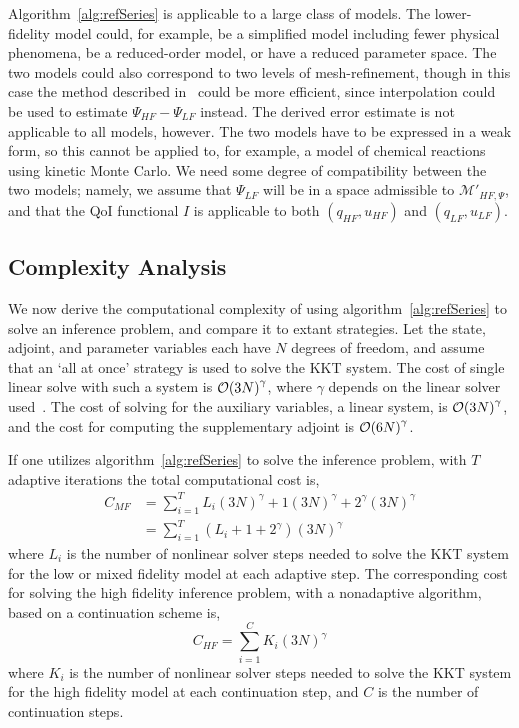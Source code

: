 Algorithm~\ref{alg:refSeries} is applicable to a large class of models. The lower-fidelity model could, for example, be a simplified model including fewer physical phenomena, be a reduced-order model, or have a reduced parameter space. The two models could also correspond to two levels of mesh-refinement, though in this case the method described in~\cite{BecVex05} could be more efficient, since interpolation could be used to estimate $\Psi_{HF}-\Psi_{LF}$ instead. The derived error estimate is not applicable to all models, however. The two models have to be expressed in a weak form, so this cannot be applied to, for example, a model of chemical reactions using kinetic Monte Carlo. We need some degree of compatibility between the two models; namely, we assume that $\Psi_{LF}$ will be in a space admissible to $\mathcal{M}'_{HF,\Psi}$, and that the QoI functional $I$ is applicable to both $(q_{HF},u_{HF})$ and $(q_{LF},u_{LF})$.
% 
\subsection{Complexity Analysis}\label{sect:alg_complexity}
%
We now derive the computational complexity of using algorithm~\ref{alg:refSeries} to solve an inference problem, and compare it to extant strategies. Let the state, adjoint, and parameter variables each have $N$ degrees of freedom, and assume that an `all at once' strategy is used to solve the KKT system. The cost of single linear solve with such a system is ${ {\cal O}(3N)}^{\gamma}$, where $\gamma$ depends on the linear solver used~\cite{}. The cost of solving for the auxiliary variables, a linear system, is ${ {\cal O}(3N)}^{\gamma}$, and the cost for computing the supplementary adjoint is ${ {\cal O}(6N)}^{\gamma}$. 

If one utilizes algorithm~\ref{alg:refSeries} to solve the inference problem, with $T$ adaptive iterations the total computational cost is,
%
\begin{align}
\label{eq:cost_adapt}
C_{MF} &= \sum_{i=1}^{T}L_{i}(3N)^{\gamma} + 1(3N)^{\gamma} + 2^{\gamma}(3N)^{\gamma} \nonumber \\
&= \sum_{i=1}^{T} (L_i + 1 + 2^{\gamma}) (3N)^{\gamma}
\end{align}
% 
where $L_i$ is the number of nonlinear solver steps needed to solve the KKT system for the low or mixed fidelity model at each adaptive step. The corresponding cost for solving the high fidelity inference problem, with a nonadaptive algorithm, based on a continuation scheme is,
%
\begin{equation}
\label{eq:cost_nadapt}
C_{HF} = \sum_{i=1}^{C}K_{i}(3N)^{\gamma}
\end{equation}
% 
where $K_i$ is the number of nonlinear solver steps needed to solve the KKT system for the high fidelity model at each continuation step, and $C$ is the number of continuation steps.

